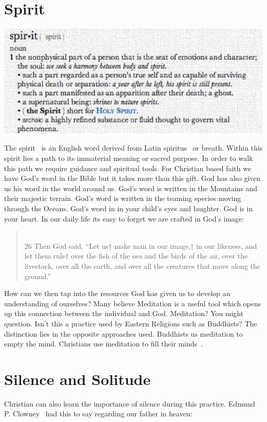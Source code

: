 \documentclass[11pt,a4paper]{scrartcl} %
\begin{document}
    \tableofcontents

\section{Spirit}
\begin{center}
\includegraphics[scale=0.5]{spirit}\\
\end{center}
\begin{doublespace}
The spirit~\cite{wiki:000} is an English word derived from Latin spiritus~\cite{wiki:001} or breath. Within this spirit lies a path to its immaterial meaning or sacred purpose. In order to walk this path we require guidance and spiritual tools. For Christian based faith we have God's word in the Bible but it takes more than this gift. God has also given us his word in the world around us. God's word is written in the Mountains and their majestic terrain. God's word is written in the teaming species moving through the Oceans. God's word in in your child's eyes and laughter. God is in your heart. In our daily life its easy to forget we are crafted in God's image:
\end{doublespace}  
\begin{verse}
\textcolor{Maroon}{}\\
26 Then God said, “Let us† make man in our image,† in our likeness, and let them rule† over the fish of the sea and the birds of the air, over the livestock, over all the earth, and over all the creatures that move along the ground.” 
\end{verse}
\begin{doublespace}
How can we then tap into the resources God has given us to develop an understanding of ourselves? Many believe Meditation is a useful tool which opens up this connection between the individual and God. Meditation? You might question. Isn't this a practice used by Eastern Religions such as Buddhists? The distinction lies in the opposite approaches used. Buddhists us meditation to empty the mind. Christians use meditation to fill their minds~\cite{wiki:003}. 
\section{Silence and Solitude}
Christian can also learn the importance of silence during this practice. Edmund P. Clowney~\cite{clowney2002christian} had this to say regarding our father in heaven:
\end{doublespace}
\end{document}
